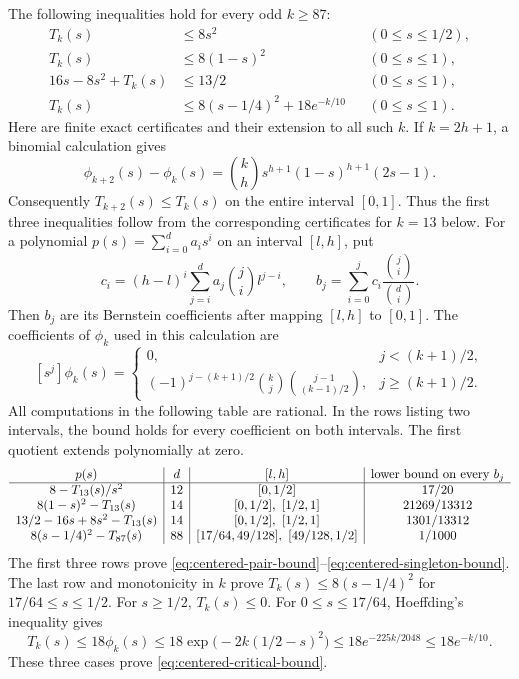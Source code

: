 \documentclass[11pt]{article}
\begin{document}
The following inequalities hold for every odd $k\ge87$:
\begin{align}
 T_k(s)&\le8s^2 &&(0\le s\le1/2),\label{eq:centered-pair-bound}\\
 T_k(s)&\le8(1-s)^2 &&(0\le s\le1),\label{eq:centered-allflip-bound}\\
 16s-8s^2+T_k(s)&\le13/2 &&(0\le s\le1),
       \label{eq:centered-singleton-bound}\\
 T_k(s)&\le8(s-1/4)^2+18e^{-k/10} &&(0\le s\le1).
       \label{eq:centered-critical-bound}
\end{align}
Here are finite exact certificates and their extension to all such $k$.
If $k=2h+1$, a binomial calculation gives
\[
 \phi_{k+2}(s)-\phi_k(s)
 =\binom{k}{h}s^{h+1}(1-s)^{h+1}(2s-1).
\]
Consequently $T_{k+2}(s)\le T_k(s)$ on the entire interval $[0,1]$.
Thus the first three inequalities follow from the corresponding
certificates for $k=13$ below. For a polynomial
$p(s)=\sum_{i=0}^d a_i s^i$ on an interval $[l,h]$, put
\[
 c_i=(h-l)^i\sum_{j=i}^d a_j\binom ji l^{j-i},\qquad
 b_j=\sum_{i=0}^j c_i\frac{\binom ji}{\binom di}.
\]
Then $b_j$ are its Bernstein coefficients after mapping $[l,h]$ to
$[0,1]$. The coefficients of $\phi_k$ used in this calculation are
\[
 {}[s^j]\phi_k(s)=
 \begin{cases}
 0,&j<(k+1)/2,\\
 (-1)^{j-(k+1)/2}\binom kj\binom{j-1}{(k-1)/2},&j\ge(k+1)/2.
 \end{cases}
\]
All computations in the following table are rational. In the rows
listing two intervals, the bound holds for every coefficient on both
intervals. The first quotient extends polynomially at zero.
\[
\begin{array}{c|c|c|c}
 p(s)&d&[l,h]&\hbox{lower bound on every }b_j\\\hline
 8-T_{13}(s)/s^2&12&[0,1/2]&17/20\\
 8(1-s)^2-T_{13}(s)&14&[0,1/2],\ [1/2,1]&21269/13312\\
 13/2-16s+8s^2-T_{13}(s)&14&[0,1/2],\ [1/2,1]&1301/13312\\
 8(s-1/4)^2-T_{87}(s)&88&[17/64,49/128],\ [49/128,1/2]&1/1000
\end{array}
\]
The first three rows prove
\eqref{eq:centered-pair-bound}--\eqref{eq:centered-singleton-bound}.
The last row and monotonicity in $k$ prove
$T_k(s)\le8(s-1/4)^2$ for $17/64\le s\le1/2$.
For $s\ge1/2$, $T_k(s)\le0$. For $0\le s\le17/64$, Hoeffding's
inequality gives
\[
 T_k(s)\le18\phi_k(s)
 \le18\exp\bigl(-2k(1/2-s)^2\bigr)
 \le18e^{-225k/2048}\le18e^{-k/10}.
\]
These three cases prove \eqref{eq:centered-critical-bound}.
\end{document}
